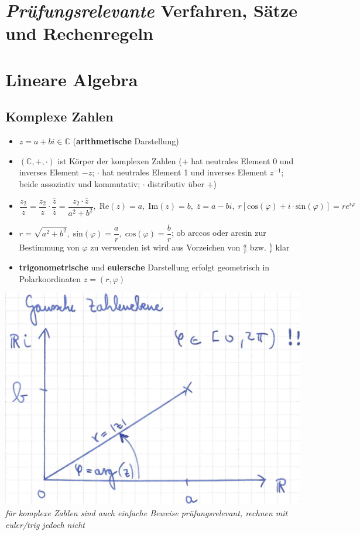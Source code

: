 \documentclass[10pt,a4paper]{article}
\begin{document}
\section*{\textit{Prüfungsrelevante} Verfahren, Sätze und Rechenregeln}
\section{Lineare Algebra}



\subsection{Komplexe Zahlen}
\begin{itemize}
\item $z=a+bi \in \mathbb{C}$ (\textbf{arithmetische} Darstellung)
\item $(\mathbb{C},+,\cdot)$ ist Körper der komplexen Zahlen (+ hat neutrales Element 0 und inverses Element $-z$; $\cdot$ hat neutrales Element 1 und inverses Element $z^{-1}$; beide assoziativ und kommutativ; $\cdot$ distributiv über +)
\item $\dfrac{z_{2}}{z}=\dfrac{z_{2}}{z}\cdot \dfrac{\overline{z}}{\overline{z}}=\dfrac{z_{2}\cdot \overline{z}}{a^2+b^2},\; \text{Re}(z)=a, \; \text{Im}(z)=b, \; \overline{z}=a-bi,\; r[\text{cos}(\varphi)+i\cdot \text{sin}(\varphi)]=re^{i\varphi}$
\item $r=\sqrt{a^2+b^2},\; \text{sin}(\varphi)=\dfrac{a}{r}, \;\text{cos}(\varphi)=\dfrac{b}{r}$; ob arccos oder arcsin zur Bestimmung von $\varphi$ zu verwenden ist wird aus Vorzeichen von $\frac{a}{r}$ bzw. $\frac{b}{r}$ klar 


\item \textbf{trigonometrische} und \textbf{eulersche} Darstellung erfolgt geometrisch in Polarkoordinaten $z=(r,\varphi)$
\end{itemize}
\begin{center}
\includegraphics[scale=0.55]{Gaussche Zahlenebene.jpg}\\
\textit{für komplexe Zahlen sind auch einfache Beweise prüfungsrelevant, rechnen mit euler/trig jedoch nicht}
\end{center}
\end{document}
